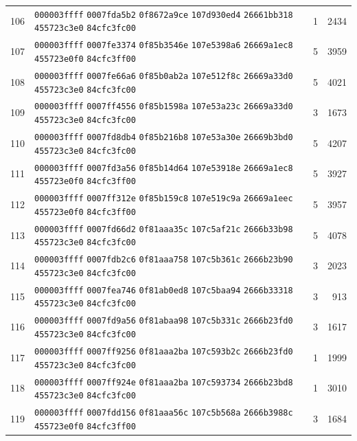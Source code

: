 \begin{longtable}{@{}r p{12cm} r r@{}}
106 & \texttt{000003ffff} \texttt{0007fda5b2} \texttt{0f8672a9ce} \texttt{107d930ed4} \texttt{26661bb318} \texttt{455723c3e0} \texttt{84cfc3fc00} & 1 & 2434 \\
107 & \texttt{000003ffff} \texttt{0007fe3374} \texttt{0f85b3546e} \texttt{107e5398a6} \texttt{26669a1ec8} \texttt{455723e0f0} \texttt{84cfc3ff00} & 5 & 3959 \\
108 & \texttt{000003ffff} \texttt{0007fe66a6} \texttt{0f85b0ab2a} \texttt{107e512f8c} \texttt{26669a33d0} \texttt{455723c3e0} \texttt{84cfc3fc00} & 5 & 4021 \\
109 & \texttt{000003ffff} \texttt{0007ff4556} \texttt{0f85b1598a} \texttt{107e53a23c} \texttt{26669a33d0} \texttt{455723c3e0} \texttt{84cfc3fc00} & 3 & 1673 \\
110 & \texttt{000003ffff} \texttt{0007fd8db4} \texttt{0f85b216b8} \texttt{107e53a30e} \texttt{26669b3bd0} \texttt{455723c3e0} \texttt{84cfc3fc00} & 5 & 4207 \\
111 & \texttt{000003ffff} \texttt{0007fd3a56} \texttt{0f85b14d64} \texttt{107e53918e} \texttt{26669a1ec8} \texttt{455723e0f0} \texttt{84cfc3ff00} & 5 & 3927 \\
112 & \texttt{000003ffff} \texttt{0007ff312e} \texttt{0f85b159c8} \texttt{107e519c9a} \texttt{26669a1eec} \texttt{455723e0f0} \texttt{84cfc3ff00} & 5 & 3957 \\
113 & \texttt{000003ffff} \texttt{0007fd66d2} \texttt{0f81aaa35c} \texttt{107c5af21c} \texttt{2666b33b98} \texttt{455723c3e0} \texttt{84cfc3fc00} & 5 & 4078 \\
114 & \texttt{000003ffff} \texttt{0007fdb2c6} \texttt{0f81aaa758} \texttt{107c5b361c} \texttt{2666b23b90} \texttt{455723c3e0} \texttt{84cfc3fc00} & 3 & 2023 \\
115 & \texttt{000003ffff} \texttt{0007fea746} \texttt{0f81ab0ed8} \texttt{107c5baa94} \texttt{2666b33318} \texttt{455723c3e0} \texttt{84cfc3fc00} & 3 & 913 \\
116 & \texttt{000003ffff} \texttt{0007fd9a56} \texttt{0f81abaa98} \texttt{107c5b331c} \texttt{2666b23fd0} \texttt{455723c3e0} \texttt{84cfc3fc00} & 3 & 1617 \\
117 & \texttt{000003ffff} \texttt{0007ff9256} \texttt{0f81aaa2ba} \texttt{107c593b2c} \texttt{2666b23fd0} \texttt{455723c3e0} \texttt{84cfc3fc00} & 1 & 1999 \\
118 & \texttt{000003ffff} \texttt{0007ff924e} \texttt{0f81aaa2ba} \texttt{107c593734} \texttt{2666b23bd8} \texttt{455723c3e0} \texttt{84cfc3fc00} & 1 & 3010 \\
119 & \texttt{000003ffff} \texttt{0007fdd156} \texttt{0f81aaa56c} \texttt{107c5b568a} \texttt{2666b3988c} \texttt{455723e0f0} \texttt{84cfc3ff00} & 3 & 1684 \\

\end{longtable}
